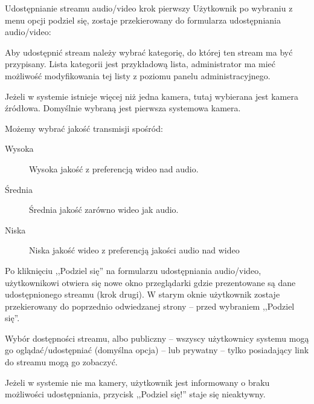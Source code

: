 \begin{userstory}{Udostępnianie streamu audio/video krok pierwszy}
    Użytkownik po wybraniu z menu opcji podziel się,
    zostaje przekierowany do formularza udostępniania audio/video:
    \begin{packed_enum}
        \item {Aby udostępnić stream należy wybrać kategorię, do której ten stream ma być przypisany. Lista kategorii jest przykładową lista, administrator ma mieć możliwość modyfikowania tej listy z poziomu panelu administracyjnego.}
        \item {Jeżeli w systemie istnieje więcej niż jedna kamera, tutaj wybierana jest kamera źródłowa. Domyślnie wybraną jest pierwsza systemowa kamera.}
        \item {Możemy wybrać jakość transmisji spośród:
            \begin{description}
                \item[Wysoka] Wysoka jakość z preferencją wideo nad audio.
                \item[Średnia] Średnia jakość zarówno wideo jak audio.
                \item[Niska] Niska jakość wideo z preferencją jakości audio nad wideo
            \end{description}
        }
        \item{Po kliknięciu ,,Podziel się'' na formularzu udostępniania audio/video, użytkownikowi otwiera się nowe okno przeglądarki gdzie prezentowane są dane udostępnionego streamu (krok drugi). W starym oknie użytkownik zostaje przekierowany do poprzednio odwiedzanej strony -- przed wybraniem ,,Podziel się''.}
        \item {Wybór dostępności streamu, albo publiczny -- wszyscy użytkownicy systemu mogą go oglądać/udostępniać (domyślna opcja) -- lub prywatny -- tylko posiadający link do streamu mogą go zobaczyć.}
    \end{packed_enum}
    \begin{tests}
        \item{Jeżeli w systemie nie ma kamery, użytkownik jest informowany o braku możliwości udostępniania, przycisk ,,Podziel się!'' staje się nieaktywny.}
    \end{tests}
\end{userstory}

